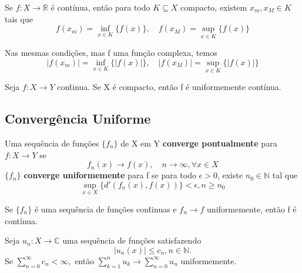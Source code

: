 \documentclass[ComplexAnalysis/complex.tex]{subfiles}
\begin{document}
\begin{crl*}
	Se $f:X\rightarrow \mathbb{R}$ é contínua, então para todo $K \subseteq{X}$ compacto, existem $x _{m}, x _{M}\in{K}$
	tais que
	$$
		f(x _{m}) = \inf _{x\in{K}} \{f(x)\}, \quad f(x _{M}) = \sup _{x\in{K}} \{f(x)\}
	$$
\end{crl*}
\begin{crl*}
	Nas mesmas condições, mas f uma função complexa, temos
	$$
		|f(x _{m})| = \inf _{x\in{K}} \{|f(x)|\}, \quad |f(x _{M})| = \sup _{x\in{K}} \{|f(x)|\}
	$$
\end{crl*}
\begin{theorem*}
	Seja $f:X\rightarrow Y$ con\'tinua. Se X é compacto, então f é uniformemente contínua.
\end{theorem*}

\subsection{Convergência Uniforme}
\begin{def*}
	Uma sequência de funções $\{f_{n}\}$ de X em Y \textbf{converge pontualmente} para $f:X\rightarrow Y$ se
	$$
		f_{n}(x)\to f(x), \quad n\to\infty, \forall{x\in{X}}
	$$
	$\{f_{n}\}$ \textbf{converge uniformemente} para f se para todo $\epsilon > 0$, existe $n_{0}\in \mathbb{N}$ tal que
	$$
		\sup _{x\in{X}} \{d'(f_{n}(x), f(x))\} < \epsilon, n\geq{n_{0}}
	$$
\end{def*}
\begin{theorem*}
	Se $\{f_{n}\}$ é uma sequência de funções con\'tinuas e $f_{n}\to{f}$ uniformemente, então f é contínua.
\end{theorem*}
\begin{theorem*}
	Seja $u_{n}:X\rightarrow \mathbb{C}$ uma sequência de funções satisfazendo
	$$
		|u_{n}(x)|\leq c_{n}, n\in \mathbb{N}.
	$$
	Se $\sum\limits_{n=0}^{\infty}c_{n} < \infty,$ então $\sum\limits_{k=1}^{n}u_{k}\to \sum\limits_{n=0}^{\infty}u_{n}$ uniformemente.
\end{theorem*}
\end{document}
